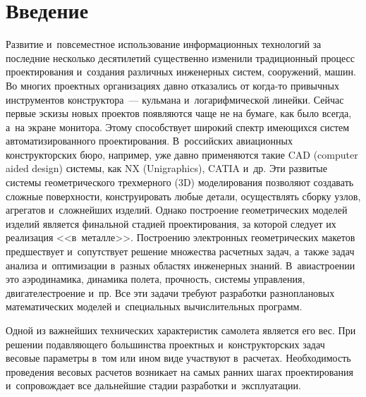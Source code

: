 
  
\vspace*{12pt}



\thispagestyle{headings}

\begin{multicols}{2}

\label{st\stat}
   
\section{Введение}

  Развитие и~повсеместное использование информационных технологий за 
последние несколько десятилетий существенно изменили традиционный 
процесс проектирования и~создания различных инженерных систем, 
сооружений, машин. Во многих проектных организациях давно отказались от 
ко\-гда-то привычных инструментов конструктора~--- кульмана 
и~логарифмической линейки. 
%
Сейчас первые эскизы новых проектов 
появляются чаще не на бумаге, как было всегда, а~на экране монитора. Этому 
способствует широкий спектр имеющихся систем автоматизированного 
проектирования. В~российских авиационных конструкторских бюро, например, уже давно 
применяются такие CAD (computer aided design)
сис\-те\-мы, как NX (Unigraphics), CATIA и~др. 
%
Эти развитые системы геометрического трех\-мер\-но\-го (3D) мо\-де\-ли\-ро\-ва\-ния позволяют 
создавать сложные по\-верх\-ности, конструировать любые детали, осуществлять 
сборку узлов, агрегатов и~сложнейших изделий. Однако построение 
геометрических моделей изделий является финальной стадией проектирования, 
за которой следует их реализация <<в~металле>>. Построению электронных 
геометрических макетов предшествует и~сопутствует решение множества 
расчетных задач, а~также задач анализа и~оптимизации в~разных областях инженерных 
знаний. В~авиастроении это аэродинамика, динамика полета, прочность, 
системы управления, двигателестроение и~пр. Все эти задачи 
требуют разработки разноплановых математических моделей и~специальных 
вычислительных программ. 
  
  Одной из важнейших технических характеристик самолета является его вес. 
При решении подавляющего большинства проектных и~конструкторских задач 
весовые параметры в~том или ином виде участвуют в~расчетах. Необходимость 
проведения весовых расчетов возникает на самых ранних шагах 
проектирования и~сопровождает все дальнейшие стадии разработки 
и~эксплуатации. 


\end{multicols}
